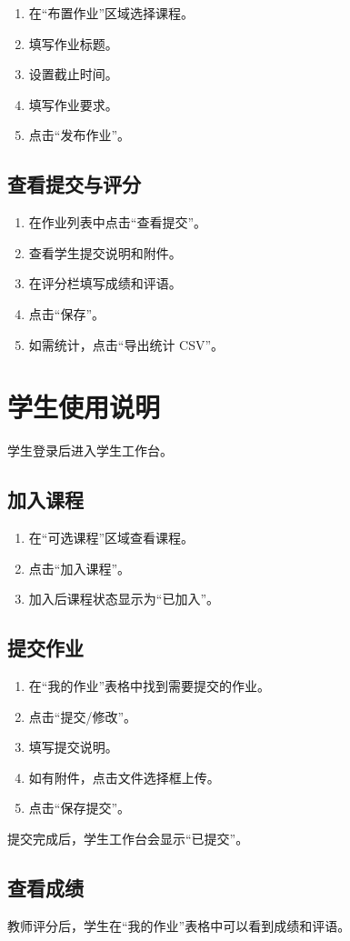 \documentclass[UTF8,12pt]{ctexart}
\begin{document}
\begin{enumerate}
  \item 在“布置作业”区域选择课程。
  \item 填写作业标题。
  \item 设置截止时间。
  \item 填写作业要求。
  \item 点击“发布作业”。
\end{enumerate}

\subsection{查看提交与评分}

\begin{enumerate}
  \item 在作业列表中点击“查看提交”。
  \item 查看学生提交说明和附件。
  \item 在评分栏填写成绩和评语。
  \item 点击“保存”。
  \item 如需统计，点击“导出统计 CSV”。
\end{enumerate}


\newpage

\section{学生使用说明}

学生登录后进入学生工作台。


\subsection{加入课程}

\begin{enumerate}
  \item 在“可选课程”区域查看课程。
  \item 点击“加入课程”。
  \item 加入后课程状态显示为“已加入”。
\end{enumerate}

\subsection{提交作业}

\begin{enumerate}
  \item 在“我的作业”表格中找到需要提交的作业。
  \item 点击“提交/修改”。
  \item 填写提交说明。
  \item 如有附件，点击文件选择框上传。
  \item 点击“保存提交”。
\end{enumerate}


提交完成后，学生工作台会显示“已提交”。


\subsection{查看成绩}

教师评分后，学生在“我的作业”表格中可以看到成绩和评语。
\end{document}
